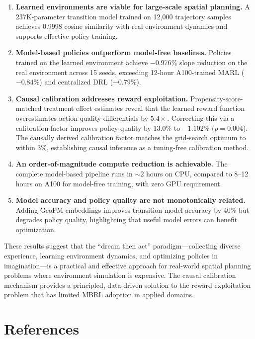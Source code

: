 \documentclass[11pt]{article}
\begin{document}
\begin{enumerate}
\item \textbf{Learned environments are viable for large-scale spatial planning.} A 237K-parameter transition model trained on 12{,}000 trajectory samples achieves 0.9998 cosine similarity with real environment dynamics and supports effective policy training.

\item \textbf{Model-based policies outperform model-free baselines.} Policies trained on the learned environment achieve $-0.976\%$ slope reduction on the real environment across 15 seeds, exceeding 12-hour A100-trained MARL ($-0.84\%$) and centralized DRL ($-0.79\%$).

\item \textbf{Causal calibration addresses reward exploitation.} Propensity-score-matched treatment effect estimates reveal that the learned reward function overestimates action quality differentials by $5.4\times$. Correcting this via a calibration factor improves policy quality by 13.0\% to $-1.102\%$ ($p = 0.004$). The causally derived calibration factor matches the grid-search optimum to within 3\%, establishing causal inference as a tuning-free calibration method.

\item \textbf{An order-of-magnitude compute reduction is achievable.} The complete model-based pipeline runs in $\sim$2 hours on CPU, compared to 8--12 hours on A100 for model-free training, with zero GPU requirement.

\item \textbf{Model accuracy and policy quality are not monotonically related.} Adding GeoFM embeddings improves transition model accuracy by 40\% but degrades policy quality, highlighting that useful model errors can benefit optimization.
\end{enumerate}

These results suggest that the ``dream then act'' paradigm---collecting diverse experience, learning environment dynamics, and optimizing policies in imagination---is a practical and effective approach for real-world spatial planning problems where environment simulation is expensive. The causal calibration mechanism provides a principled, data-driven solution to the reward exploitation problem that has limited MBRL adoption in applied domains.


\section*{References}
\end{document}

